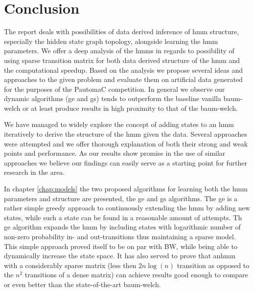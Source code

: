 \chapter{Conclusion}
\label{chap:conclusion}
The report deals with possibilities of data derived inference of \gls{hmm} structure, especially the hidden state graph topology, alongside learning the \gls{hmm} parameters. We offer a deep analysis of the \glspl{hmm} in regards to possibility of using sparse transition matrix for both data derived structure of the \gls{hmm} and the computational  speedup. Based on the analysis we propose several ideas and approaches to the given problem and evaluate them on artificial data generated for the purposes of the PautomaC competition. In general we observe our dynamic algorithms (\acrfull{ge} and \acrfull{gs}) tends to outperform the baseline vanilla \gls{baum-welch} or at least produce results in high proximity to that of the \gls{baum-welch}.

We have managed to widely explore the concept of adding states to an \gls{hmm} iteratively to derive the structure of the \gls{hmm} given the data. Several approaches were attempted and we offer thorough explanation of both their strong and weak points and performance. As our results show promise in the use of similar approaches we believe our findings can easily serve as a starting point for further research in the area.

In chapter \ref{chap:models} the two proposed algorithms for learning both the \gls{hmm} parameters and structure are presented, the \acrlong{ge} and \acrlong{gs} algorithms. The \gls{ge} is a rather simple greedy approach to continuously extending the \gls{hmm} by adding new states, while such a state can be found in a reasonable amount of attempts. Th \gls{ge} algorithm expands the \gls{hmm} by including states with logarithmic number of non-zero probability in- and out-transitions thus maintaining a sparse model. This simple approach proved itself to be on par with BW, while being able to dynamically increase the state space. It has also served to prove that an\gls{hmm} with a considerably sparse matrix (less then $2n\log(n)$ transition as opposed to the $n^2$ transitions of a dense matrix) can achieve results good enough to compare or even better than the state-of-the-art \gls{baum-welch}.


